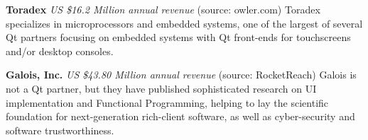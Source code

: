\begin{frame}{}
{\begin{minipage}{\textwidth}
{\begin{enumerate}
\dmitem \textbf{Toradex} 
\textit{US \$16.2 Million annual revenue} (source: owler.com)
Toradex specializes in microprocessors 
and embedded systems, one of the largest 
of several Qt partners focusing on 
embedded systems with Qt front-ends 
for touchscreens and/or desktop consoles.\vspace{20pt}

\dmitem \textbf{Galois, Inc.} 
\textit{US \$43.80 Million annual revenue} (source: RocketReach) Galois is not a Qt partner, but 
they have published sophisticated research on 
UI implementation and Functional Programming, helping 
to lay the scientific foundation for next-generation 
rich-client software, as well as cyber-security and 
software trustworthiness.


\end{enumerate}}
\end{minipage}

}

\end{frame}
